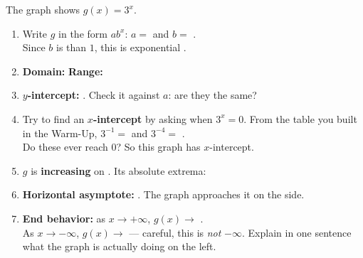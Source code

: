 \documentclass[10pt]{article}
\newcommand{\lgrid}[4]{%
  \draw[step=1, linegray!40, very thin] (#1,#3) grid (#2,#4);
  \draw[->, semithick, charcoal] (#1,0)--(#2,0) node[below right, font=\scriptsize]{$x$};
  \draw[->, semithick, charcoal] (0,#3)--(0,#4) node[left, font=\scriptsize]{$y$};}
\newcommand{\expcurve}[4]{\draw[very thick, forest, domain=#3:#4, samples=120, smooth]
  plot (\x,{#1*exp((#2)*(\x))});}
\begin{document}
\begin{tcolorbox}[colback=white, colframe=black!40, title=\textbf{Tier R --- Remediate},
    fonttitle=\bfseries, arc=1.5mm, left=3mm, right=3mm, top=2mm, bottom=2mm, breakable]
The graph shows $g(x) = 3^{x}$.
\begin{center}
\end{center}
\begin{enumerate}[leftmargin=1.7em, itemsep=7pt]
  \item Write $g$ in the form $ab^{x}$: \; $a=$ \blank{1.4cm} and $b=$ \blank{1.4cm}. \\
        Since $b$ is \blank{1.8cm} than $1$, this is exponential \blank{2.0cm}.
  \item \textbf{Domain:} \blank{3.0cm} \quad \textbf{Range:} \blank{3.0cm}
  \item \textbf{$y$-intercept:} \blank{1.8cm}. \; Check it against $a$: are they the same?
        \blank{1.4cm}
  \item Try to find an \textbf{$x$-intercept} by asking when $3^{x}=0$. From the table you built in
        the Warm-Up, $3^{-1}=$ \blank{1.2cm} and $3^{-4}=$ \blank{1.6cm}. \\
        Do these ever reach $0$? \blank{1.4cm} \; So this graph has \blank{2.4cm}
        $x$-intercept.
  \item $g$ is \textbf{increasing} on \blank{3.0cm}. \quad Its absolute extrema:
        \blank{2.4cm}
  \item \textbf{Horizontal asymptote:} \blank{1.8cm}. \; The graph approaches it on the
        \blank{1.6cm} side.
  \item \textbf{End behavior:} as $x\to+\infty$, $g(x)\to$ \blank{1.4cm}. \\
        As $x\to-\infty$, $g(x)\to$ \blank{1.4cm} --- careful, this is \emph{not} $-\infty$.
        Explain in one sentence what the graph is actually doing on the left. \blank{5.4cm}
\end{enumerate}
\end{tcolorbox}
\end{document}
